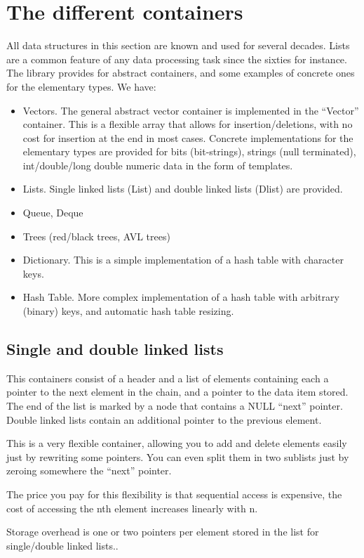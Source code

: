 \documentclass[12pt,a4paper]{memoir} %
\newcommand{\Null}{
{\footnotesize NULL}
}
\begin{document}
\section{The different containers}
All data structures in this section are known and used for several decades. Lists are a common feature of any data processing task since the sixties for instance. 
The library provides for abstract containers, and some examples of concrete ones for the elementary types.
We have:
\begin{itemize}
\item
Vectors. The general abstract vector container is implemented in the “Vector” container. This is a flexible array that allows for insertion/deletions, with no cost for insertion at the end in most cases. Concrete implementations for the elementary types are provided for bits (bit-strings), strings (null terminated), int/double/long double numeric data in the form of templates.
\item
Lists. Single linked lists (List) and double linked lists (Dlist) are provided.
\item
Queue, Deque
\item
Trees (red/black trees, AVL trees)
\item
Dictionary. This is a simple implementation of a hash table with character keys.
\item
Hash Table. More complex implementation of a hash table with arbitrary (binary) keys, and automatic hash table resizing.
\end{itemize}
\subsection{ Single and double linked lists}
This containers consist of a header and a list of elements containing each a pointer to the next element in the chain, and a pointer to the data item stored. The end of the list is marked by a node that contains a\Null “next” pointer. Double linked lists contain an additional pointer to the previous element.

This is a very flexible container, allowing you to add and delete elements easily just by rewriting some pointers. You can even split them in two sublists just by zeroing somewhere the “next” pointer.

The price you pay for this flexibility is that sequential access is expensive, the cost of accessing the nth element increases linearly with n.

Storage overhead is one or two pointers per element stored in the list for single/double linked lists..
\end{document}
